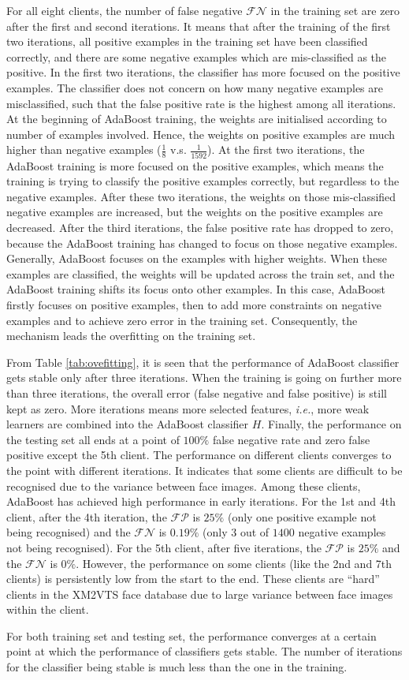 For all eight clients, the number of false negative $\mathcal{FN}$ in the training set are zero after the first and second iterations. It means that after the training of the first two iterations, all positive examples in the training set have been classified correctly, and there are some negative examples which are mis-classified as the positive. In the first two iterations, the classifier has more focused on the positive examples. The classifier does not concern on how many negative examples are misclassified, such that the false positive rate is the highest among all iterations. At the beginning of AdaBoost training, the weights are initialised according to number of examples involved. Hence, the weights on positive examples are much higher than negative examples ($\frac{1}{8}$ v.s. $\frac{1}{1592}$). At the first two iterations, the AdaBoost training is more focused on the positive examples, which means the training is trying to classify the positive examples correctly, but regardless to the negative examples. After these two iterations, the weights on those mis-classified negative examples are increased, but the weights on the positive examples are decreased. After the third iterations, the false positive rate has dropped to zero, because the AdaBoost training has changed to focus on those negative examples. Generally, AdaBoost focuses on the examples with higher weights. When these examples are classified, the weights will be updated across the train set, and the AdaBoost training shifts its focus onto other examples. In this case, AdaBoost firstly focuses on positive examples, then to add more constraints on negative examples and to achieve zero error in the training set. Consequently, the mechanism leads the overfitting on the training set.

From \mbox{Table} \ref{tab:ovefitting}, it is seen that the performance of AdaBoost classifier gets stable only after three iterations. When the training is going on further more than three iterations, the overall error (false negative and false positive) is still kept as zero. More iterations means more selected features,\textit{ i.e.}, more weak learners are combined into the AdaBoost classifier $H$. Finally, the performance on the testing set all ends at a point of $100\%$ false negative rate and zero false positive except the 5th client. The performance on different clients converges to the point with different iterations. It indicates that some clients are difficult to be recognised due to the variance between face images. Among these clients, AdaBoost has achieved high performance in early iterations. For the 1st and 4th client, after the 4th iteration, the $\mathcal{FP}$ is $25\%$ (only one positive example not being recognised) and the $\mathcal{FN}$ is $0.19\%$ (only $3$ out of $1400$ negative examples not being recognised). For the 5th client, after five iterations, the $\mathcal{FP}$ is $25\%$ and the $\mathcal{FN}$ is $0\%$. However, the performance on some clients (like the 2nd and 7th clients) is persistently low from the start to the end. These clients are ``hard'' clients in the \mbox{XM2VTS} face database due to large variance between face images within the client.

For both training set and testing set, the performance converges at a certain point at which the performance of classifiers gets stable. The number of iterations for the classifier being stable is much less than the one in the training.